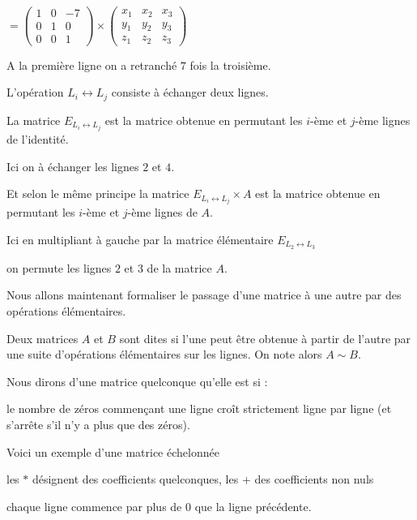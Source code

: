 \change
$
= \begin{pmatrix}
  1&0&-7\\0&1&0\\0&0&1  
  \end{pmatrix}
  \times
  \begin{pmatrix}
  x_1&x_2&x_3\\y_1&y_2&y_3\\z_1&z_2&z_3  
  \end{pmatrix}$
  
\change
A la première ligne on a retranché $7$ fois la troisième.

\diapo

L'opération $L_i \leftrightarrow L_j$ consiste à échanger deux lignes.

\change
La matrice  $E_{L_i \leftrightarrow L_j}$ est la matrice obtenue 
   en permutant les $i$-ème et $j$-ème lignes de l'identité. 

\change
Ici on à échanger les lignes $2$ et $4$.


\change
Et selon le même principe la matrice  $E_{L_i \leftrightarrow L_j} \times A$ 
est la matrice obtenue en permutant les $i$-ème et $j$-ème lignes de $A$. 

\change

\change

\change
Ici en multipliant à gauche par la matrice élémentaire $E_{L_2 \leftrightarrow L_3}$

on permute les lignes $2$ et $3$ de la matrice $A$.


\diapo
Nous allons maintenant formaliser le passage d'une matrice à une autre par des opérations élémentaires.


Deux matrices $A$ et $B$ sont dites  si l'une 
peut être obtenue à partir de l'autre par une suite d'opérations 
élémentaires sur les lignes. On note alors $A \sim B$.

\change
Nous dirons d'une matrice quelconque qu'elle est  si :

le nombre de zéros commençant une ligne croît strictement ligne par ligne 
(et s'arrête s'il n'y a plus que des zéros).
  
\change
Voici un exemple d'une matrice échelonnée

les $*$ désignent des coefficients quelconques, les $+$ des coefficients non nuls

chaque ligne commence par plus de $0$ que la ligne précédente.

